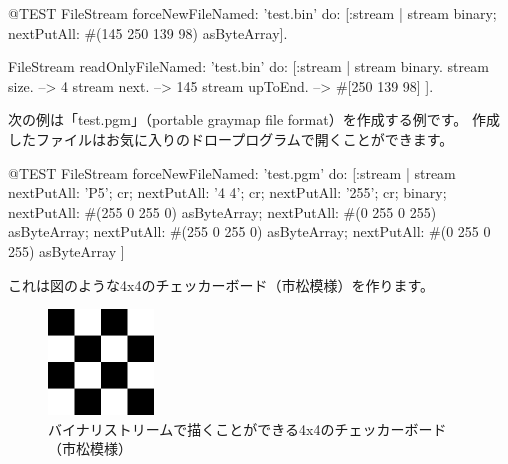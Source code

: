 \documentclass[a4paper,10pt,twoside]{book}
\begin{document}
\begin{code}{@TEST}
FileStream
  forceNewFileNamed: 'test.bin'
  do: [:stream |
          stream
            binary;
            nextPutAll: #(145 250 139 98) asByteArray].

FileStream
  readOnlyFileNamed: 'test.bin'
  do: [:stream |
          stream binary.
          stream size.         --> 4
          stream next.         --> 145
          stream upToEnd. --> #[250 139 98]
      ].
\end{code}

次の例は「test.pgm」（portable graymap file format）を作成する例です。
作成したファイルはお気に入りのドロープログラムで開くことができます。


\begin{code}{@TEST}
FileStream
  forceNewFileNamed: 'test.pgm' 
  do: [:stream |
	stream
		nextPutAll: 'P5'; cr;
		nextPutAll: '4 4'; cr;
		nextPutAll: '255'; cr;
		binary;
		nextPutAll: #(255 0 255 0) asByteArray;
		nextPutAll: #(0 255 0 255) asByteArray;
		nextPutAll: #(255 0 255 0) asByteArray;
		nextPutAll: #(0 255 0 255) asByteArray
	]
\end{code}

これは図のような4x4のチェッカーボード（市松模様）を作ります。

\begin{figure}[!ht]
\centerline{\includegraphics[width=0.25\textwidth]{checkerboard4x4}}
\caption{バイナリストリームで描くことができる4x4のチェッカーボード（市松模様）}
\vspace{.2in}
\end{figure}

\end{document}

